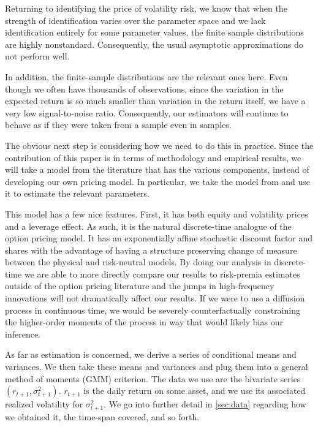 \documentclass[11pt, letterpaper, twoside, final]{article}
\begin{document}
Returning to identifying the price of volatility risk, we know that when the strength of identification varies over the parameter space and we lack identification entirely for some parameter values, the finite sample distributions are highly nonstandard.  Consequently, the usual asymptotic   approximations do not perform well. 

In addition, the finite-sample distributions are the relevant ones here.  Even though we often have thousands of observations, since the variation in the expected return is so much smaller than variation in the return itself, we have a very low signal-to-noise ratio. Consequently, our estimators will continue to behave as if they were taken from a  sample even in  samples.

The obvious next step is considering how we need to do this in practice. Since the contribution of this paper is in terms of methodology and empirical results, we will take a model from the literature that has the various components, instead of developing our own pricing model. In particular, we take the model from \textcite{khrapov2016affine} and use it to estimate the relevant parameters. 

This model has a few nice features.  First, it has both equity and volatility prices and a leverage effect.  As such, it is the natural discrete-time analogue of the \textcite{heston1993closedform} option pricing model.  It has an exponentially affine stochastic discount factor and shares with \textcite{heston1993closedform} the advantage of having a structure preserving change of measure between the physical and risk-neutral models. By doing our analysis in discrete-time we are able to more directly compare our results to risk-premia estimates outside of the option pricing literature and the jumps in high-frequency innovations will not dramatically affect our results.  If we were to use a diffusion process in continuous time, we would be severely counterfactually constraining the higher-order moments of the process in way that would likely bias our inference. 

As far as estimation is concerned, we derive a series of conditional means and variances. We then take these means and variances and plug them into a general method of moments (GMM) criterion. The data we use are the bivariate series $(r_{t+1}, \sigma^2_{t+1})$. $r_{t+1}$ is the daily return on some asset, and we use its associated realized volatility for $\sigma^2_{t+1}$. We go into further detail in \cref{sec:data} regarding how we obtained it, the time-span covered, and so forth.
\end{document}
